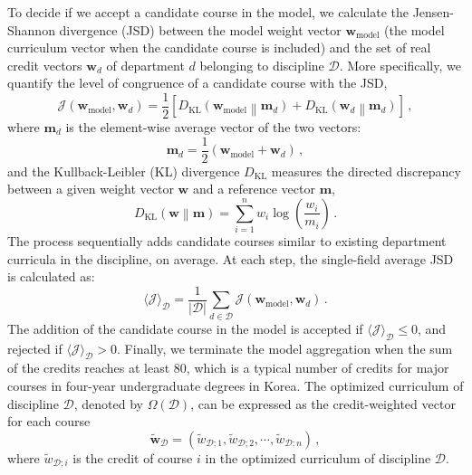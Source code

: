 \documentclass{bmcart}
\begin{document}
To decide if we accept a candidate course in the model, we calculate the Jensen-Shannon divergence (JSD) between the model weight vector \( \mathbf{w}_\mathrm{model} \) (the model curriculum vector when the candidate course is included) and the set of real credit vectors \( \mathbf{w}_d \) of department $d$ belonging to discipline $\mathcal{D}$. 
More specifically, we quantify the level of congruence of a candidate course with the JSD,
\begin{equation}
\mathcal{J}\left(\mathbf{w}_\mathrm{model},\mathbf{w}_d \right) = \frac{1}{2} \left[ D_\text{KL}\left(\mathbf{w}_\mathrm{model} \middle\| \mathbf{m}_d \right) 
    + D_\text{KL}\left(\mathbf{w}_d \middle\| \mathbf{m}_d \right) \right] \,,
\end{equation}
where \( \mathbf{m}_d \) is the element-wise average vector of the two vectors:
\begin{equation}
    \mathbf{m}_d = \frac{1}{2} \left( \mathbf{w}_\mathrm{model} + \mathbf{w}_d \right) \,,
\end{equation}
and the Kullback-Leibler (KL) divergence \( D_\text{KL} \) measures the directed discrepancy between a given weight vector \( \mathbf{w} \) and a reference vector \( \mathbf{m} \),
\begin{equation}
D_\text{KL}\left(\mathbf{w} \middle\| \mathbf{m}\right) = \sum_{i=1}^{n} w_i \log \left( \frac{w_i}{m_i} \right) \,.
\label{eq:KL}
\end{equation} 
The process sequentially adds candidate courses similar to existing department curricula in the discipline, on average. At each step, the single-field average JSD is calculated as:
\begin{equation}
\langle \mathcal{J} \rangle_\mathcal{D} = \frac{1}{|\mathcal{D}|} \sum_{d \in \mathcal{D}} \mathcal{J}\left(\mathbf{w}_\mathrm{model},\mathbf{w}_d \right) \,.
\end{equation} 
The addition of the candidate course in the model is accepted if $\langle \mathcal{J} \rangle_\mathcal{D} \le 0$, and rejected if $\langle \mathcal{J} \rangle_\mathcal{D} > 0$. Finally, we terminate the model aggregation when the sum of the credits reaches at least $80$, which is a typical number of credits for major courses in four-year undergraduate degrees in Korea. The optimized curriculum of discipline $\mathcal{D}$, denoted by $\Omega \left( \mathcal{D} \right)$, can be expressed as the credit-weighted vector for each course
\begin{equation}
\tilde{\mathbf{w}}_\mathcal{D} = \left( \tilde{w}_{\mathcal{D};1}, \tilde{w}_{\mathcal{D};2}, \cdots,  \tilde{w}_{\mathcal{D};n} \right) \,,
\label{eq:single_opt_weight_vector}
\end{equation}
where $\tilde{w}_{\mathcal{D};i}$ is the credit of course $i$ in the optimized curriculum of discipline $\mathcal{D}$.
\end{document}
